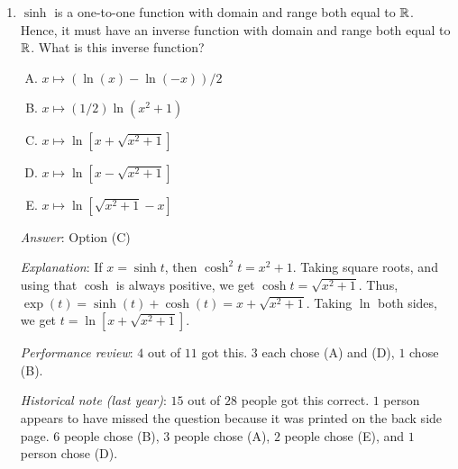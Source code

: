 \documentclass[10pt]{amsart}
\begin{document}
\begin{enumerate}
  {\em Answer}: Option (C)

  {\em Explanation}: The $\sinh$ function has domain and range both
  $\R$. The $\arctan$ function has domain $\R$ and range
  $(-\pi/2,\pi/2)$. Thus, the composite has domain $\R$ (any real
  input is permisible) and range equal to $(-\pi/2,\pi/2)$.

  {\em Performance review}: $8$ out of $11$ got this. $3$ chose (D).

  {\em Historical note (last year)}: $24$ out of $28$ people got this
  correct. $3$ people chose (D) and $1$ person chose (B).
\item $\sinh$ is a one-to-one function with domain and range both
  equal to $\R$. Hence, it must have an inverse function with domain
  and range both equal to $\R$. What is this inverse function?
  \begin{enumerate}[(A)]
  \item $x \mapsto (\ln(x) - \ln(-x))/2$
  \item $x \mapsto (1/2)\ln(x^2 + 1)$
  \item $x \mapsto \ln[x + \sqrt{x^2 + 1}]$
  \item $x \mapsto \ln[x - \sqrt{x^2 + 1}]$
  \item $x \mapsto \ln[\sqrt{x^2 + 1} - x]$
  \end{enumerate}

  {\em Answer}: Option (C)

  {\em Explanation}: If $x = \sinh t$, then $\cosh^2 t = x^2 +
  1$. Taking square roots, and using that $\cosh$ is always positive,
  we get $\cosh t = \sqrt{x^2 + 1}$. Thus, $\exp(t) = \sinh(t) +
  \cosh(t) = x + \sqrt{x^2 + 1}$. Taking $\ln$ both sides, we get $t =
  \ln[x + \sqrt{x^2 + 1}]$.

  {\em Performance review}: $4$ out of $11$ got this. $3$ each chose
  (A) and (D), $1$ chose (B).

  {\em Historical note (last year)}: $15$ out of $28$ people got this
  correct. $1$ person appears to have missed the question because it
  was printed on the back side page. $6$ people chose (B), $3$ people
  chose (A), $2$ people chose (E), and $1$ person chose (D).
\end{enumerate}
\end{document}

